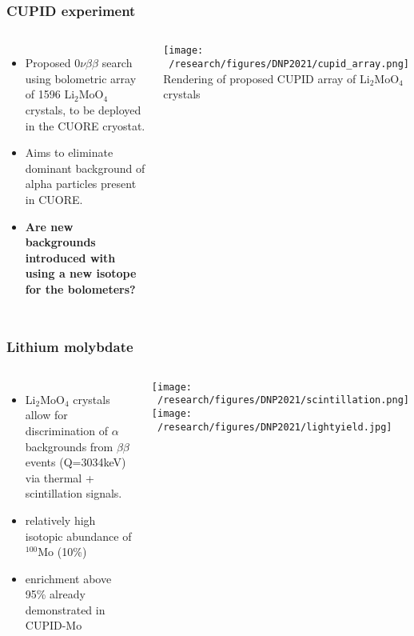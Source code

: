 \documentclass{beamer}
\begin{document}
	\begin{frame}
		\frametitle{CUPID experiment}
		\begin{columns}[c] %
			
			\begin{itemize}
				\setlength\itemsep{2em}
				\item Proposed $0\nu\beta\beta$ search using bolometric array of 1596 Li$_2$MoO$_4$ crystals, to be deployed in the CUORE cryostat.
				\item Aims to eliminate dominant background of alpha particles present in CUORE.
				\item \textbf{Are new backgrounds introduced with using a new isotope for the bolometers?}
			\end{itemize}
			
			\texttt{[image: ~/research/figures/DNP2021/cupid\_array.png]}
			{\footnotesize Rendering of proposed CUPID array of Li$_2$MoO$_4$ crystals}
			
		\end{columns}
	\end{frame}
	

	\begin{frame}
		\frametitle{Lithium molybdate}
		\begin{columns}[c] %
			
			\begin{itemize}
				\setlength\itemsep{2em}
				\item Li$_2$MoO$_4$ crystals allow for discrimination of $\alpha$ backgrounds from $\beta\beta$ events (Q=3034keV) via thermal + scintillation signals.
				\item relatively high isotopic abundance of $^{100}$Mo (10\%)
				\item enrichment above 95\% already demonstrated in CUPID-Mo \cite{}
			\end{itemize}
			
			\texttt{[image: ~/research/figures/DNP2021/scintillation.png]}
			\texttt{[image: ~/research/figures/DNP2021/lightyield.jpg]}
		\end{columns}
	\end{frame}
\end{document}
